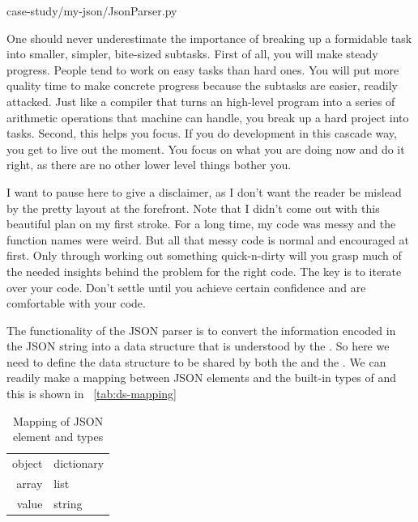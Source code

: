 
{case-study/my-json/JsonParser.py}

One should never underestimate the importance of breaking up a formidable task into smaller,
simpler, bite-sized subtasks.
First of all, you will make steady progress.
People tend to work on easy tasks than hard ones.
You will put more quality time to make concrete progress because the subtasks are easier, readily
attacked.
Just like a compiler that turns an high-level program into a series of arithmetic
operations that machine can handle, you break up a hard project into tasks.
Second, this helps you focus.
If you do development in this cascade way, you get to live out the moment.
You focus on what you are doing now and do it right, as there are no other lower level things
bother you.

I want to pause here to give a disclaimer, as
I don't want the reader be mislead by the pretty layout at the forefront.
Note that I didn't come out with this beautiful plan on my first stroke.
For a long time, my code was messy and the function names were weird.
But all that messy code is normal and encouraged at first.
Only through working out something quick-n-dirty will you grasp much of the needed insights
behind the problem for the right code.
The key is to iterate over your code.
Don't settle until you achieve certain confidence and are comfortable with your code.

The functionality of the JSON parser is to convert the information encoded in the JSON string
into a data structure that is understood by the .
So here we need to define the data structure to be shared by both the  and the
.
We can readily make a mapping between JSON elements and the built-in types of \python and this is
shown in ~\autoref{tab:ds-mapping}

\begin{table}[h]
    \begin{center}
        \caption{Mapping of JSON element and \python types
        \label{tab:ds-mapping}}
        \begin{tabular}{r|l}
            object & dictionary \\
            array & list \\
            value & string \\
        \end{tabular}
    \end{center}
\end{table}


